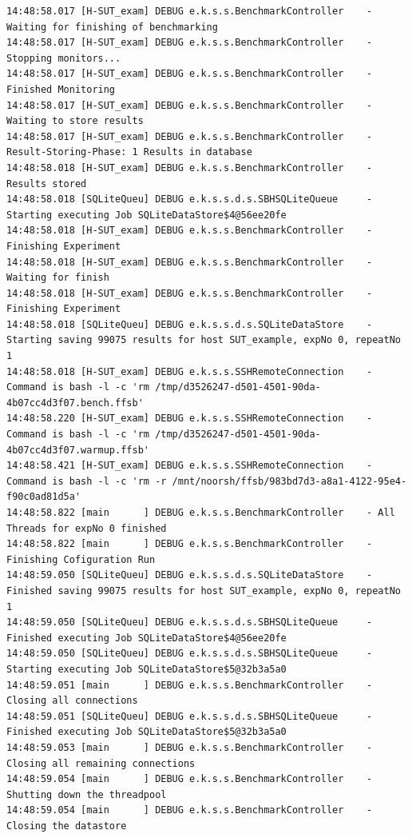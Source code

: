 \begin{lstlisting}
14:48:58.017 [H-SUT_exam] DEBUG e.k.s.s.BenchmarkController    - Waiting for finishing of benchmarking
14:48:58.017 [H-SUT_exam] DEBUG e.k.s.s.BenchmarkController    - Stopping monitors...
14:48:58.017 [H-SUT_exam] DEBUG e.k.s.s.BenchmarkController    - Finished Monitoring
14:48:58.017 [H-SUT_exam] DEBUG e.k.s.s.BenchmarkController    - Waiting to store results
14:48:58.017 [H-SUT_exam] DEBUG e.k.s.s.BenchmarkController    - Result-Storing-Phase: 1 Results in database
14:48:58.018 [H-SUT_exam] DEBUG e.k.s.s.BenchmarkController    - Results stored
14:48:58.018 [SQLiteQueu] DEBUG e.k.s.s.d.s.SBHSQLiteQueue     - Starting executing Job SQLiteDataStore$4@56ee20fe
14:48:58.018 [H-SUT_exam] DEBUG e.k.s.s.BenchmarkController    - Finishing Experiment
14:48:58.018 [H-SUT_exam] DEBUG e.k.s.s.BenchmarkController    - Waiting for finish
14:48:58.018 [H-SUT_exam] DEBUG e.k.s.s.BenchmarkController    - Finishing Experiment
14:48:58.018 [SQLiteQueu] DEBUG e.k.s.s.d.s.SQLiteDataStore    - Starting saving 99075 results for host SUT_example, expNo 0, repeatNo 1
14:48:58.018 [H-SUT_exam] DEBUG e.k.s.s.SSHRemoteConnection    - Command is bash -l -c 'rm /tmp/d3526247-d501-4501-90da-4b07cc4d3f07.bench.ffsb'
14:48:58.220 [H-SUT_exam] DEBUG e.k.s.s.SSHRemoteConnection    - Command is bash -l -c 'rm /tmp/d3526247-d501-4501-90da-4b07cc4d3f07.warmup.ffsb'
14:48:58.421 [H-SUT_exam] DEBUG e.k.s.s.SSHRemoteConnection    - Command is bash -l -c 'rm -r /mnt/noorsh/ffsb/983bd7d3-a8a1-4122-95e4-f90c0ad81d5a'
14:48:58.822 [main      ] DEBUG e.k.s.s.BenchmarkController    - All Threads for expNo 0 finished
14:48:58.822 [main      ] DEBUG e.k.s.s.BenchmarkController    - Finishing Cofiguration Run
14:48:59.050 [SQLiteQueu] DEBUG e.k.s.s.d.s.SQLiteDataStore    - Finished saving 99075 results for host SUT_example, expNo 0, repeatNo 1
14:48:59.050 [SQLiteQueu] DEBUG e.k.s.s.d.s.SBHSQLiteQueue     - Finished executing Job SQLiteDataStore$4@56ee20fe
14:48:59.050 [SQLiteQueu] DEBUG e.k.s.s.d.s.SBHSQLiteQueue     - Starting executing Job SQLiteDataStore$5@32b3a5a0
14:48:59.051 [main      ] DEBUG e.k.s.s.BenchmarkController    - Closing all connections
14:48:59.051 [SQLiteQueu] DEBUG e.k.s.s.d.s.SBHSQLiteQueue     - Finished executing Job SQLiteDataStore$5@32b3a5a0
14:48:59.053 [main      ] DEBUG e.k.s.s.BenchmarkController    - Closing all remaining connections
14:48:59.054 [main      ] DEBUG e.k.s.s.BenchmarkController    - Shutting down the threadpool
14:48:59.054 [main      ] DEBUG e.k.s.s.BenchmarkController    - Closing the datastore

\end{lstlisting} 

